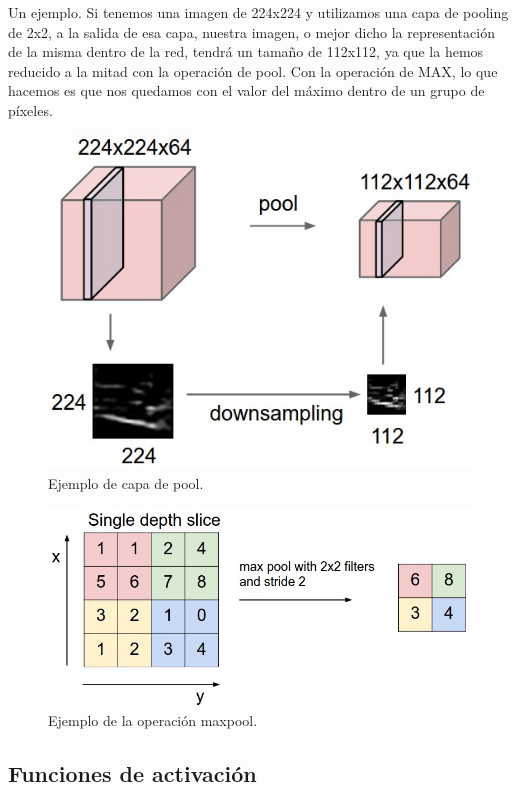 Un ejemplo. Si tenemos una imagen de 224x224 y utilizamos una capa de pooling de 2x2, a la salida de esa capa, nuestra imagen, o mejor dicho la representación de la misma dentro de la red, tendrá un tamaño de 112x112, ya que la hemos reducido a la mitad con la operación de pool. Con la operación de MAX, lo que hacemos es que nos quedamos con el valor del máximo dentro de un grupo de píxeles.\\

\begin{figure}[H]
	\centering
	\caption{Ejemplo de capa de pool.}
    \includegraphics[width=\textwidth]{./imagenes/pool.jpeg}
\end{figure}
\begin{figure}[H]
	\centering
	\caption{Ejemplo de la operación maxpool.}
    \includegraphics[width=\textwidth]{./imagenes/maxpool.jpeg}
\end{figure}

\subsection{Funciones de activación}

